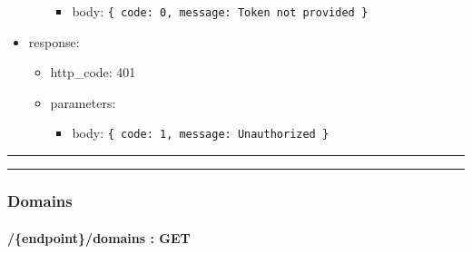 \documentclass[
]{article}
\begin{document}
\begin{itemize}
\begin{itemize}
    \begin{itemize}
    \item
      body: \texttt{\{
      \textquotesingle{}code\textquotesingle{}:\ 0,\ 
      \textquotesingle{}message\textquotesingle{}:\ \textquotesingle{}Token\ not\ provided\textquotesingle{}
      \}}
    \end{itemize}
  \end{itemize}
\item
  response:

  \begin{itemize}
  \item
    http\_code: 401
  \item
    parameters:

    \begin{itemize}
    \item
      body: \texttt{\{
      \textquotesingle{}code\textquotesingle{}:\ 1,\ 
      \textquotesingle{}message\textquotesingle{}:\ \textquotesingle{}Unauthorized\textquotesingle{}
      \}}
    \end{itemize}
  \end{itemize}
\end{itemize}

\begin{center}\rule{0.5\linewidth}{0.5pt}\end{center}

\begin{center}\rule{0.5\linewidth}{0.5pt}\end{center}

\hypertarget{header-n61008}{%
\subsubsection{Domains}\label{header-n61008}}

\hypertarget{header-n61009}{%
\paragraph{/\{endpoint\}/domains : GET}\label{header-n61009}}
\end{document}
